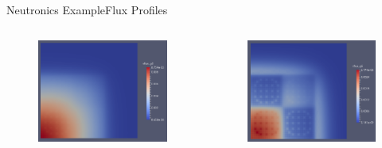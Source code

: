 \documentclass{beamer}
\begin{document}
\begin{frame}{Neutronics Example}{Flux Profiles}%
  \begin{columns}
    \begin{column}{0.5\textwidth}
      \begin{figure}
        \centering
        \includegraphics[width=\linewidth]{c5g7/flux0}
      \end{figure}
    \end{column}
    \begin{column}{0.5\textwidth}
      \begin{figure}
        \centering
        \includegraphics[width=\linewidth]{c5g7/flux5}
      \end{figure}
    \end{column}
  \end{columns}
\end{frame}
\end{document}
